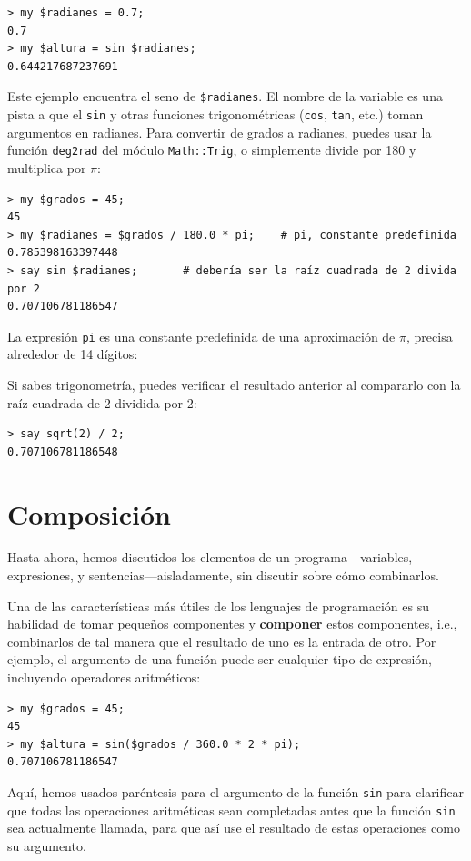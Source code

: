 \begin{verbatim}
> my $radianes = 0.7;
0.7
> my $altura = sin $radianes;
0.644217687237691
\end{verbatim}

Este ejemplo encuentra el seno de \verb|$radianes|. El 
nombre de la variable es una pista a que el {\tt sin} y 
otras funciones trigonométricas ({\tt cos}, {\tt tan}, etc.) toman
argumentos en radianes. Para convertir de grados a radianes, puedes
usar la función \verb'deg2rad' del  módulo \verb|Math::Trig|, o
simplemente divide por 180 y multiplica por $\pi$:

\begin{verbatim}
> my $grados = 45;
45
> my $radianes = $grados / 180.0 * pi;    # pi, constante predefinida 
0.785398163397448
> say sin $radianes;       # debería ser la raíz cuadrada de 2 divida por 2
0.707106781186547
\end{verbatim}
%
La expresión {\tt pi} es una constante predefinida de una
aproximación de $\pi$, precisa alrededor de 14 dígitos:

Si sabes trigonometría, puedes verificar el resultado anterior
al compararlo con la raíz cuadrada de 2 dividida por 2:

\begin{verbatim}
> say sqrt(2) / 2;
0.707106781186548
\end{verbatim}
%

\section{Composición}

Hasta ahora, hemos discutidos los elementos de un programa---variables,
expresiones, y sentencias---aisladamente, sin discutir sobre
cómo combinarlos.

Una de las características más útiles de los lenguajes de programación
es su habilidad de tomar pequeños componentes y {\bf componer} estos
componentes, i.e.,
combinarlos de tal manera que el resultado de uno es la entrada
de otro. Por ejemplo, el argumento de una función  puede ser cualquier
tipo de expresión, incluyendo operadores aritméticos:

\begin{verbatim}
> my $grados = 45;
45
> my $altura = sin($grados / 360.0 * 2 * pi);
0.707106781186547
\end{verbatim}
%
Aquí, hemos usados paréntesis para el argumento de la función
{\tt sin} para clarificar que todas las operaciones aritméticas
sean completadas antes que la función {\tt sin} sea actualmente
llamada, para que así use el resultado de estas operaciones 
como su argumento.

